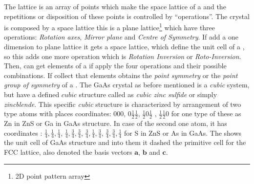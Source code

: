 The lattice is an array of points which make the space lattice of a \cry and the repetitions or disposition of these points is controlled by ``\sym operations''\cite{chatterjee2008crystallography}. The crystal is composed by a space lattice this is a plane lattice\footnote{2D point pattern array} which have three \sym operations: \emph{Rotation axes}, \emph{Mirror plane} and \emph{Centre of Symmetry}. If add a one dimension to plane lattice it gets a space lattice, which define the unit cell of a \cry, so this adds one more \sym operation which is \emph{Rotation Inversion} or \emph{Roto-Inversion}. Then, can get \sym elements of a \cry if  apply the four \sym operations and their possible combinations. If collect that \sym elements obtains the \emph{point symmetry} or the \emph{point group of symmetry} of a \cry. 
The GaAs crystal as before mentioned is a \emph{cubic} system, but have a defined $cubic$ structure  called  as \emph{cubic zinc sulfide} or simply \emph{zincblende}. This specific \emph{cubic} structure  is characterized by arrangement of two type atoms with places  coordinates: $000$, $0\frac{1}{2}\frac{1}{2}$,  $\frac{1}{2} 0\frac{1}{2}$ , $\frac{1}{2} \frac{1}{2} 0$ for one type of these as Zn in ZnS or Ga in GaAs structure. In case of the second one atom, it has coordinates : $\frac{1}{4},\frac{1}{4},\frac{1}{4}$, $\frac{1}{4},\frac{3}{4},\frac{3}{4}$, $\frac{3}{4},\frac{1}{4}, \frac{3}{4}$, $\frac{3}{4},\frac{3}{4},\frac{1}{4}$ for S in ZnS or As in GaAs\cite{kittel2018kittel,mckelvey1966solid}.   The  shows the unit cell of GaAs structure and into them it  dashed the primitive cell for the FCC lattice, also denoted the basis vectors  $\mathbf{a}$, $\mathbf{b}$ and $\mathbf{c}$.

